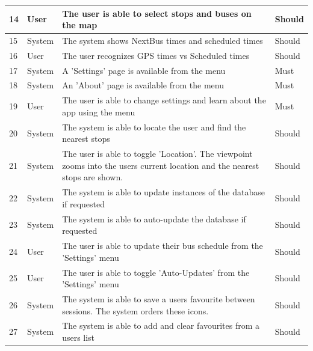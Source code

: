 \documentclass[a4paper,12pt]{article}
\begin{document}
\begin{tabular}{p{0.4cm}|p{2cm}|p{8.4cm}|p{1.7cm}}
14 & User & The user is able to select stops and buses on the map & Should \\
\hline
15 & System & The system shows NextBus times and scheduled times & Should \\
\hline
16 & User & The user recognizes GPS times vs Scheduled times & Should \\
\hline
17 & System & A 'Settings' page is available from the menu & Must \\
\hline
18 & System & An 'About' page is available from the menu & Must \\
\hline
19 & User & The user is able to change settings and learn about the app using the menu & Must \\
\hline
20 & System & The system is able to locate the user and find the nearest stops & Should \\
\hline
21 & System & The user is able to toggle 'Location'. The viewpoint zooms into the users current location and the nearest stops are shown. & Should \\
\hline
22 & System & The system is able to update instances of the database if requested & Should \\
\hline
23 & System & The system is able to auto-update the database if requested & Should \\
\hline
24 & User & The user is able to update their bus schedule from the 'Settings' menu & Should \\
\hline
25 & User & The user is able to toggle 'Auto-Updates' from the 'Settings' menu & Should \\
\hline
26 & System & The system is able to save a users favourite between sessions. The system orders these icons. & Should \\
\hline
27 & System & The system is able to add and clear favourites from a users list & Should \\
\hline

\end{tabular}

\pagebreak
\end{document}
